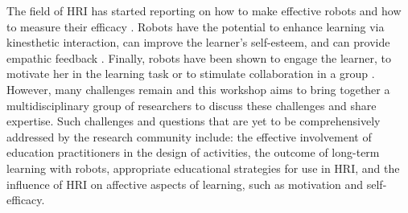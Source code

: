 \documentclass{sig-alternate-05-2015}
\begin{document}








The field of HRI has started reporting on how to make 
effective robots and how to measure their efficacy 
\cite{kennedy2016social,tanaka2015pepper}. Robots have the 
potential to enhance learning via kinesthetic interaction, can improve 
the learner's self-esteem, and can provide empathic feedback 
\cite{castellano2013towards,lemaignan2016,tanaka2012children}. Finally, robots have been shown to engage the 
learner, to motivate her in the learning task or to stimulate collaboration in a 
group \cite{park2013providing}. However, many challenges remain and this workshop aims to bring 
together a multidisciplinary group of researchers to discuss these challenges 
and share expertise. Such challenges and questions that are yet to be comprehensively addressed by the research community include: the effective involvement of education practitioners in the design of activities, the outcome of long-term learning with robots, appropriate educational strategies for use in HRI, and the influence of HRI on affective aspects of learning, such as motivation and self-efficacy.

\end{document}
